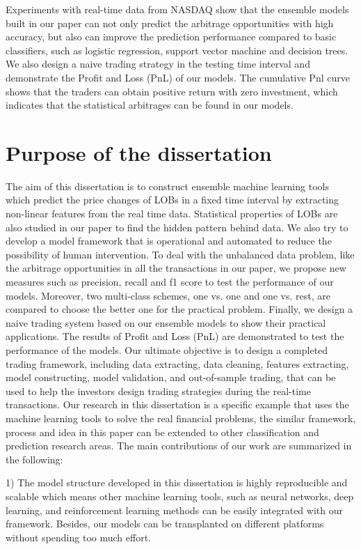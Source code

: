 Experiments with real-time data from NASDAQ show that the ensemble models built in our paper can not only predict the arbitrage opportunities with high accuracy,  but also can improve the prediction performance compared to basic classifiers,  such as logistic regression,  support vector machine and decision trees. We also design a naive trading strategy in the testing time interval and demonstrate the Profit and Loss  (PnL) of our models. The cumulative Pnl curve shows that the traders can obtain positive return with zero investment,  which indicates that the statistical arbitrages can be found in our models.

\section{Purpose of the dissertation}
The aim of this dissertation is to construct ensemble machine learning tools which predict the price changes of LOBs in a fixed time interval by extracting non-linear features from the real time data.  Statistical properties of LOBs are also studied in our paper to find the hidden pattern behind data. We also try to develop a model framework that is operational and automated to reduce the possibility of human intervention. To deal with the unbalanced data problem,  like the arbitrage opportunities in all the transactions in our paper,  we propose new measures such as precision,  recall and f1 score to test the performance of our models. Moreover,  two multi-class schemes,  one vs. one and one vs. rest,  are compared to choose the better one for the practical problem. Finally,  we design a naive trading system based on our ensemble models to show their practical applications. The results of Profit and Loss (PnL) are demonstrated to test the performance of the models. Our ultimate objective is to design a completed trading framework,  including data extracting,  data cleaning,  features extracting,  model constructing,  model validation,  and out-of-sample trading,  that can be used to help the investors design trading strategies during the real-time transactions. Our research in this dissertation is a specific example that uses the machine learning tools to solve the real financial problems,  the similar framework,  process and idea in this paper can be extended to other classification and prediction research areas. The main contributions of our work are summarized in the following:

1) The model structure developed in this dissertation is highly reproducible and scalable which means other machine learning tools,  such as neural networks,  deep learning, and reinforcement learning methods can be easily integrated with our framework. Besides,  our models can be transplanted on different platforms without spending too much effort.

